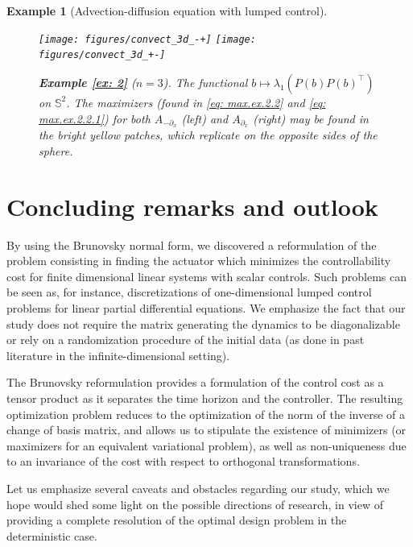 \documentclass[11pt, a4paper, reqno]{amsart}
\newcommand{\del}{\partial}
\theoremstyle{plain}
\numberwithin{equation}{section}
\newtheorem{example}{Example}[section]
\begin{document}
\begin{example}[Advection-diffusion equation with lumped control]
	\begin{figure}
	\begin{center}
	\texttt{[image: figures/convect\_3d\_-+]}
	\texttt{[image: figures/convect\_3d\_+-]}	
	\end{center}
	\caption{\textbf{Example \ref{ex: 2}} ($n=3$). The functional $b\mapsto \lambda_1(P(b)P(b)^\top)$ on $\mathbb{S}^2$. The maximizers (found in \eqref{eq: max.ex.2.2} and \eqref{eq: max.ex.2.2.1}) for both $A_{-\del_x}$ (\emph{left}) and $A_{\del_x}$ (\emph{right}) may be found in the bright yellow patches, which replicate on the opposite sides of the sphere.}
	\label{fig: ex2.2}
	\end{figure}
	
	\end{example}
	
	\section{Concluding remarks and outlook}
	
	By using the Brunovsky normal form, we discovered a reformulation of the problem consisting in finding the actuator which minimizes the controllability cost for finite dimensional linear systems with scalar controls. Such problems can be seen as, for instance, discretizations of one-dimensional lumped control problems for linear partial differential equations. We emphasize the fact that our study does not require the matrix generating the dynamics to be diagonalizable or rely on a randomization procedure of the initial data (as done in past literature in the infinite-dimensional setting).
	
	The Brunovsky reformulation provides a formulation of the control cost as a tensor product as it separates the time horizon and the controller. The resulting optimization problem reduces to the optimization of the norm of the inverse of a change of basis matrix, and allows us to stipulate the existence of minimizers (or maximizers for an equivalent variational problem), as well as non-uniqueness due to an invariance of the cost with respect to orthogonal transformations. 
	
	Let us emphasize several caveats and obstacles regarding our study, which we hope would shed some light on the possible directions of research, in view of providing a complete resolution of the optimal design problem in the deterministic case. 	
	
\end{document}
